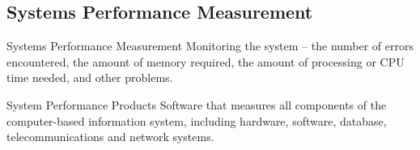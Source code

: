 \documentclass[\main/notes.tex]{subfiles}
\begin{document}
			\subsection{Systems Performance Measurement}
				\begin{definition}{Systems Performance Measurement}
					Monitoring the system -- the number of errors encountered, the amount of memory required, the amount of processing or CPU time needed, and other problems.
				\end{definition}
				\begin{definition}{System Performance Products}
					Software that measures all components of the computer-based information system, including hardware, software, database, telecommunications and network systems.
				\end{definition}
\end{document}

